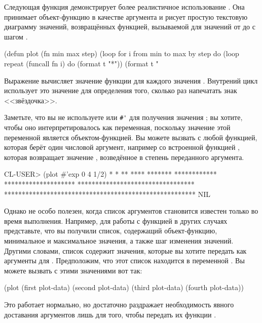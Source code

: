 Следующая функция демонстрирует более реалистичное использование .  Она
принимает объект-функцию в качестве аргумента и рисует простую текстовую диаграмму
значений, возвращённых функцией, вызываемой для значений от  до  с
шагом .

\begin{myverb}
  (defun plot (fn min max step)
    (loop for i from min to max by step do
          (loop repeat (funcall fn i) do (format t "*"))
          (format t "~%
\end{myverb}

Выражение  вычисляет значение функции для каждого значения .
Внутрений цикл использует это значение для определения того, сколько раз напечатать знак
<<звёздочка>>.

Заметьте, что вы не используете  или \lstinline!#'! для получения значения
; вы хотите, чтобы оно интерпретировалось как переменная, поскольку значение этой
переменной является объектом-функцией.  Вы можете вызвать  с любой функцией,
которая берёт один числовой аргумент, например со встроенной функцией , которая
возвращает значение , возведённое в степень переданного аргумента.

\begin{myverb}
  CL-USER> (plot #'exp 0 4 1/2)
  *
  *
  **
  ****
  *******
  ************
  ********************
  *********************************
  ******************************************************
  NIL
\end{myverb}

Однако  не особо полезен, когда список аргументов становится известен только
во время выполнения.  Например, для работы с функцией  в других случаях
представьте, что вы получили список, содержащий объект-функцию, минимальное и максимальное
значения, а также шаг изменения значений.  Другими словами, список содержит значения,
которые вы хотите передать как аргументы для .  Предположим, что этот список
находится в переменной .  Вы можете вызвать  с этими значениями
вот так:

\begin{myverb}
  (plot 
    (first plot-data) 
    (second plot-data) 
    (third plot-data) 
    (fourth plot-data))
\end{myverb}

Это работает нормально, но достаточно раздражает необходимость явного доставания
аргументов лишь для того, чтобы передать их функции .


